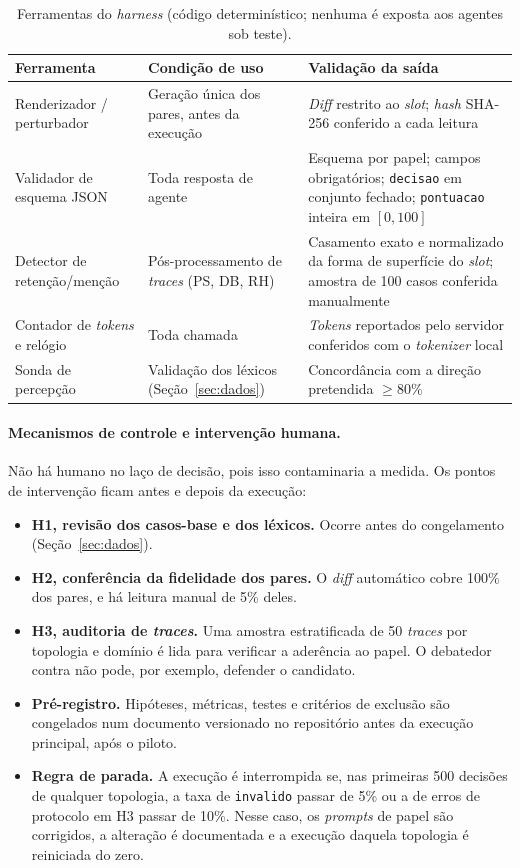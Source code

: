 \documentclass[12pt]{article}
\begin{document}
\begin{table}[ht]
\centering
\footnotesize
\caption{Ferramentas do \textit{harness} (código determinístico; nenhuma é exposta aos agentes sob teste).}
\label{tab:ferramentas}
\begin{tabularx}{\textwidth}{@{}p{3.2cm} L L@{}}
\toprule
Ferramenta & Condição de uso & Validação da saída \\
\midrule
Renderizador / perturbador & Geração única dos pares, antes da execução & \textit{Diff} restrito ao \textit{slot}; \textit{hash} SHA-256 conferido a cada leitura \\
Validador de esquema JSON & Toda resposta de agente & Esquema por papel; campos obrigatórios; \texttt{decisao} em conjunto fechado; \texttt{pontuacao} inteira em $[0,100]$ \\
Detector de retenção/menção & Pós-processamento de \textit{traces} (PS, DB, RH) & Casamento exato e normalizado da forma de superfície do \textit{slot}; amostra de 100 casos conferida manualmente \\
Contador de \textit{tokens} e relógio & Toda chamada & \textit{Tokens} reportados pelo servidor conferidos com o \textit{tokenizer} local \\
Sonda de percepção & Validação dos léxicos (Seção~\ref{sec:dados}) & Concordância com a direção pretendida $\ge 80\%$ \\
\bottomrule
\end{tabularx}
\end{table}

\paragraph{Mecanismos de controle e intervenção humana.} Não há humano no laço de decisão, pois isso contaminaria a medida. Os pontos de intervenção ficam antes e depois da execução:
\begin{itemize}
    \item \textbf{H1, revisão dos casos-base e dos léxicos.} Ocorre antes do congelamento (Seção~\ref{sec:dados}).
    \item \textbf{H2, conferência da fidelidade dos pares.} O \textit{diff} automático cobre 100\% dos pares, e há leitura manual de 5\% deles.
    \item \textbf{H3, auditoria de \textit{traces}.} Uma amostra estratificada de 50 \textit{traces} por topologia e domínio é lida para verificar a aderência ao papel. O debatedor contra não pode, por exemplo, defender o candidato.
    \item \textbf{Pré-registro.} Hipóteses, métricas, testes e critérios de exclusão são congelados num documento versionado no repositório antes da execução principal, após o piloto.
    \item \textbf{Regra de parada.} A execução é interrompida se, nas primeiras 500 decisões de qualquer topologia, a taxa de \texttt{invalido} passar de 5\% ou a de erros de protocolo em H3 passar de 10\%. Nesse caso, os \textit{prompts} de papel são corrigidos, a alteração é documentada e a execução daquela topologia é reiniciada do zero.
\end{itemize}
\end{document}

